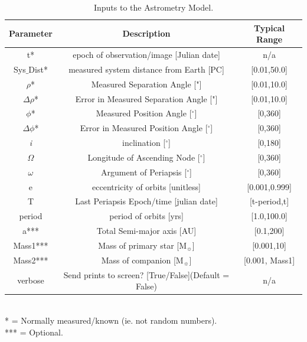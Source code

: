 \documentclass[12pt,preprint]{aastex}
\begin{document}
\begin{table}[h]
\centering
\caption{ Inputs to the Astrometry Model.}
\begin{tabular}{c c c}
\hline\hline
Parameter & Description & Typical Range \\
\hline
t* & epoch of observation/image [Julian date] & n/a\\
Sys$\_$Dist* & measured system distance from Earth [PC] &  [0.01,50.0]\\
$\rho$* & Measured Separation Angle ["] & [0.01,10.0]\\
$\Delta\rho$* & Error in Measured Separation Angle ["] & [0.01,10.0]\\
$\phi$*  & Measured Position Angle  [$^{\circ}$] & [0,360]\\
$\Delta\phi$*  & Error in Measured Position Angle  [$^{\circ}$] & [0,360]\\
{\it i} & inclination [$^{\circ}$] & [0,180]\\
$\Omega$ & Longitude of Ascending Node [$^{\circ}$] & [0,360]\\
$\omega$ & Argument of Periapsis [$^{\circ}$] & [0,360]\\
e & eccentricity of orbits [unitless] & [0.001,0.999]\\
T & Last Periapsis Epoch/time [julian date] & [t-period,t]\\
period & period of orbits [yrs] & [1.0,100.0]\\
a*** & Total Semi-major axis [AU]  & [0.1,200] \\
Mass1*** & Mass of primary star [M$_{\sun}$] & [0.001,10] \\
Mass2*** & Mass of companion [M$_{\sun}$] & [0.001, Mass1] \\
verbose & Send prints to screen? [True/False](Default = False) & n/a\\
\hline
\end{tabular}
\\
 * = Normally measured/known (ie. not random numbers).\\
 *** = Optional.
\end{table}

\end{document}

